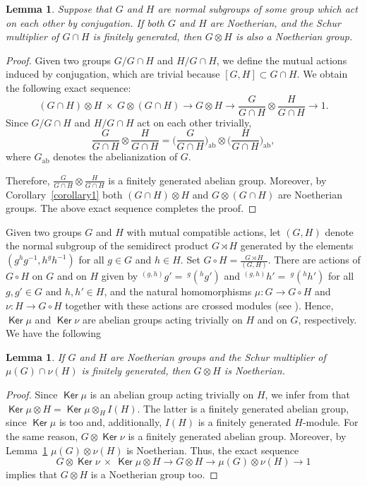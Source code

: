 \documentclass[12pt,reqno]{amsart}
\newtheorem{lemma}[subsection]{Lemma}
\theoremstyle{definition}
\numberwithin{equation}{section}
\theoremstyle{definition}
\DeclareMathOperator{\Ker}{\mathsf {Ker}}
\DeclareMathOperator{\ab}{ab}
\begin{document}
\begin{lemma} \label{lemma2} Suppose that $G$ and $H$ are normal subgroups of some group which act on each other by conjugation.
If both $G$ and $H$ are Noetherian, and the Schur multiplier of $G\cap H$ is finitely generated, then $G\otimes H$
is also a Noetherian group.
\end{lemma}
\begin{proof} Given two groups $G/G\cap H$ and $H/G\cap H$, we define the mutual actions induced by conjugation, which are trivial
because $[G, H]\subset G\cap H$. We obtain the following exact sequence:
\[
(G\cap H)\otimes H \:\times \: G \otimes (G\cap H) \to G\otimes H \to \frac{G}{G\cap H}\otimes  \frac{H}{G\cap H}\to 1.
\]
Since $G/G\cap H$ and $H/G\cap H$ act on each other trivially,
\[
\frac{G}{G\cap H}\otimes  \frac{H}{G\cap H} = \Bigg(\frac{G}{G\cap H}\Bigg)_{\ab}\otimes
\Bigg(\frac{H}{G\cap H}\Bigg)_{\ab},
\]
where $G_{\ab}$ denotes the abelianization of $G$.

Therefore, $\frac{G}{G\cap H}\otimes  \frac{H}{G\cap H}$ is a finitely generated abelian group. Moreover, by Corollary~\ref{corollary1}
both $(G\cap H)\otimes H$ and  $G \otimes (G\cap H)$ are Noetherian groups. The above exact sequence completes
the proof.
\end{proof}

Given two groups $G$ and $H$ with mutual compatible actions, let $(G, H)$ denote the normal subgroup of the semidirect product
$G \rtimes H$ generated by the elements $(g^hg^{-1}, h^gh^{-1})$ for all $g\in G$ and $h\in H$. Set
$G\circ H = \frac{G \rtimes H}{(G, H)}$. There are actions of $G\circ H$ on $G$ and on $H$ given by $^{(g, h)}g' =
\:^{g}(^hg')$ and  $^{(g, h)}h' =\:^{g}(^hh')$ for all $g, g' \in G$ and $h, h' \in H$, and the natural homomorphisms
$\mu \colon G \to G\circ H$ and $\nu \colon H \to G\circ H$ together with these actions are crossed modules (see \cite{Ell87f}).
Hence, $\Ker \mu$ and $\Ker \nu$ are abelian groups acting trivially on $H$ and on $G$, respectively. We have the following

\begin{lemma} \label{lemma3} If $G$ and $H$ are Noetherian groups and the Schur multiplier of $\mu (G) \cap \nu (H)$ is finitely generated, then $G\otimes H$ is Noetherian.
\end{lemma}
\begin{proof} Since $\Ker \mu$ is an abelian group  acting trivially on $H$, we infer from \cite{Gu88} that
 $\Ker \mu\otimes H = \Ker \mu\otimes_H I(H)$. The latter is a finitely generated abelian group, since $\Ker\mu$ is too and, additionally, $I(H)$ is a finitely generated $H$-module.  For the same reason, $G\otimes \Ker\nu$ is a finitely generated
abelian group. Moreover, by Lemma~\ref{lemma2} $\mu (G)\otimes \nu(H)$ is Noetherian. Thus, the exact sequence
\[
G\otimes \Ker\nu \: \times \:\Ker \mu \otimes H \to G\otimes H \to \mu (G)\otimes \nu(H)\to 1
\]
implies that $G\otimes H$ is a Noetherian group too.
\end{proof}
\end{document}
